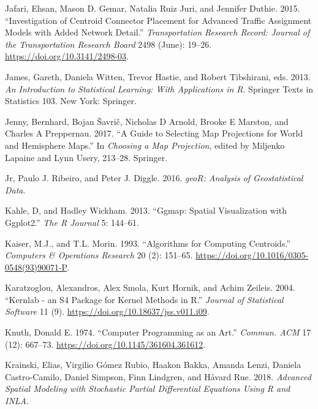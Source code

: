 \documentclass[]{krantz}
\begin{document}
\leavevmode\hypertarget{ref-jafari_investigation_2015}{}%
Jafari, Ehsan, Mason D. Gemar, Natalia Ruiz Juri, and Jennifer Duthie. 2015. ``Investigation of Centroid Connector Placement for Advanced Traffic Assignment Models with Added Network Detail.'' \emph{Transportation Research Record: Journal of the Transportation Research Board} 2498 (June): 19--26. \url{https://doi.org/10.3141/2498-03}.

\leavevmode\hypertarget{ref-james_introduction_2013}{}%
James, Gareth, Daniela Witten, Trevor Hastie, and Robert Tibshirani, eds. 2013. \emph{An Introduction to Statistical Learning: With Applications in R}. Springer Texts in Statistics 103. New York: Springer.

\leavevmode\hypertarget{ref-jenny_guide_2017}{}%
Jenny, Bernhard, Bojan Šavrič, Nicholas D Arnold, Brooke E Marston, and Charles A Preppernau. 2017. ``A Guide to Selecting Map Projections for World and Hemisphere Maps.'' In \emph{Choosing a Map Projection}, edited by Miljenko Lapaine and Lynn Usery, 213--28. Springer.

\leavevmode\hypertarget{ref-jr_geor_2016}{}%
Jr, Paulo J. Ribeiro, and Peter J. Diggle. 2016. \emph{geoR: Analysis of Geostatistical Data}.

\leavevmode\hypertarget{ref-kahle_ggmap_2013}{}%
Kahle, D, and Hadley Wickham. 2013. ``Ggmap: Spatial Visualization with Ggplot2.'' \emph{The R Journal} 5: 144--61.

\leavevmode\hypertarget{ref-kaiser_algorithms_1993}{}%
Kaiser, M.J., and T.L. Morin. 1993. ``Algorithms for Computing Centroids.'' \emph{Computers \& Operations Research} 20 (2): 151--65. \url{https://doi.org/10.1016/0305-0548(93)90071-P}.

\leavevmode\hypertarget{ref-karatzoglou_kernlab_2004}{}%
Karatzoglou, Alexandros, Alex Smola, Kurt Hornik, and Achim Zeileis. 2004. ``Kernlab - an S4 Package for Kernel Methods in R.'' \emph{Journal of Statistical Software} 11 (9). \url{https://doi.org/10.18637/jss.v011.i09}.

\leavevmode\hypertarget{ref-knuth_computer_1974}{}%
Knuth, Donald E. 1974. ``Computer Programming as an Art.'' \emph{Commun. ACM} 17 (12): 667--73. \url{https://doi.org/10.1145/361604.361612}.

\leavevmode\hypertarget{ref-krainski_advanced_2018}{}%
Krainski, Elias, Virgilio Gómez Rubio, Haakon Bakka, Amanda Lenzi, Daniela Castro-Camilo, Daniel Simpson, Finn Lindgren, and Håvard Rue. 2018. \emph{Advanced Spatial Modeling with Stochastic Partial Differential Equations Using R and INLA}.
\end{document}
